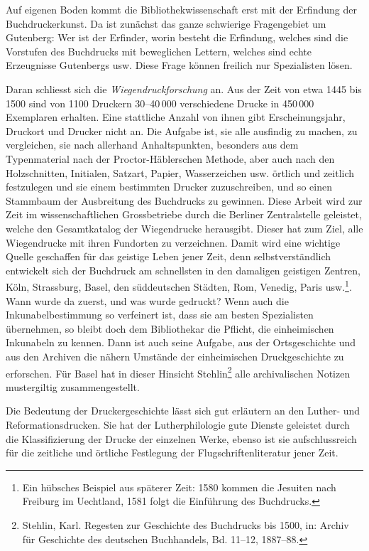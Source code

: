 \documentclass[a4paper,
fontsize=11pt,
oneside,
numbers=noperiodatend,
parskip=half-,
bibliography=totoc,
final
]{scrartcl}
\begin{document}
Auf eigenen Boden kommt die Bibliothekwissenschaft erst mit der
Erfindung der Buchdruckerkunst. Da ist zunächst das ganze schwierige
Fragengebiet um Gutenberg: Wer ist der Erfinder, worin besteht die
Erfindung, welches sind die Vorstufen des Buchdrucks mit beweglichen
Lettern, welches sind echte Erzeugnisse Gutenbergs usw. Diese Frage
können freilich nur Spezialisten lösen.

Daran schliesst sich die \emph{Wiegendruckforschung} an. Aus der Zeit
von etwa 1445 bis 1500 sind von 1100 Druckern 30--40\,000 verschiedene
Drucke in 450\,000 Exemplaren erhalten. Eine stattliche Anzahl von ihnen
gibt Erscheinungsjahr, Druckort und Drucker nicht an. Die Aufgabe ist,
sie alle ausfindig zu machen, zu vergleichen, sie nach allerhand
Anhaltspunkten, besonders aus dem Typenmaterial nach der
Proctor-Häblerschen Methode, aber auch nach den Holzschnitten,
Initialen, Satzart, Papier, Wasserzeichen usw. örtlich und zeitlich
festzulegen und sie einem bestimmten Drucker zuzuschreiben, und so einen
Stammbaum der Ausbreitung des Buchdrucks zu gewinnen. Diese Arbeit wird
zur Zeit im wissenschaftlichen Grossbetriebe durch die Berliner
Zentralstelle geleistet, welche den Gesamtkatalog der Wiegendrucke
herausgibt. Dieser hat zum Ziel, alle Wiegendrucke mit ihren Fundorten
zu verzeichnen. Damit wird eine wichtige Quelle geschaffen für das
geistige Leben jener Zeit, denn selbstverständlich entwickelt sich der
Buchdruck am schnellsten in den damaligen geistigen Zentren, Köln,
Strassburg, Basel, den süddeutschen Städten, Rom, Venedig, Paris
usw.\footnote{Ein hübsches Beispiel aus späterer Zeit: 1580 kommen die
  Jesuiten nach Freiburg im Uechtland, 1581 folgt die Einführung des
  Buchdrucks.}. Wann wurde da zuerst, und was wurde gedruckt? Wenn auch
die Inkunabelbestimmung so verfeinert ist, dass sie am besten
Spezialisten übernehmen, so bleibt doch dem Bibliothekar die Pflicht,
die einheimischen Inkunabeln zu kennen. Dann ist auch seine Aufgabe, aus
der Ortsgeschichte und aus den Archiven die nähern Umstände der
einheimischen Druckgeschichte zu erforschen. Für Basel hat in dieser
Hinsicht Stehlin\footnote{Stehlin, Karl. Regesten zur Geschichte des
  Buchdrucks bis 1500, in: Archiv für Geschichte des deutschen
  Buchhandels, Bd. 11--12, 1887--88.} alle archivalischen Notizen
mustergiltig zusammengestellt.

Die Bedeutung der Druckergeschichte lässt sich gut erläutern an den
Luther- und Reformationsdrucken. Sie hat der Lutherphilologie gute
Dienste geleistet durch die Klassifizierung der Drucke der einzelnen
Werke, ebenso ist sie aufschlussreich für die zeitliche und örtliche
Festlegung der Flugschriftenliteratur jener Zeit.
\end{document}
